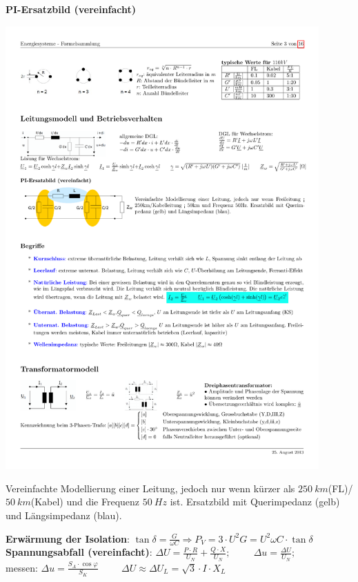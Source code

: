 		\textbf{PI-Ersatzbild (vereinfacht)} \\
		\begin{minipage}[lt]{6cm}
			\includegraphics[width=0.9\textwidth]{./images/Leitungsmodell2.pdf}
		\end{minipage}
		\begin{minipage}[rt]{13cm}
			Vereinfachte Modellierung einer Leitung, jedoch nur wenn kürzer als $250~km$(FL)/$50~km$(Kabel) und die Frequenz $50~Hz$ ist. Ersatzbild mit Querimpedanz (gelb) und Längsimpedanz (blau).
		\end{minipage}
		\textbf{Erwärmung der Isolation}: $\tan \delta = \frac{G}{\omega C} \Rightarrow P_V = 3 \cdot U^2 G = U^2 \omega C \cdot \tan \delta$ \\
		\textbf{Spannungsabfall (vereinfacht)}: $\Delta U = \frac{P \cdot R}{U_N} + \frac{Q \cdot X}{U_N}; \hspace{1cm} \Delta u = \frac{\Delta U}{U_N}; \hspace{1cm}$ messen: $\Delta u = \frac{S_A \cdot \cos \varphi}{S_K} \hspace{1cm} \Delta U \approx  \Delta U_L = \sqrt{3} \cdot I \cdot X_L$\\
